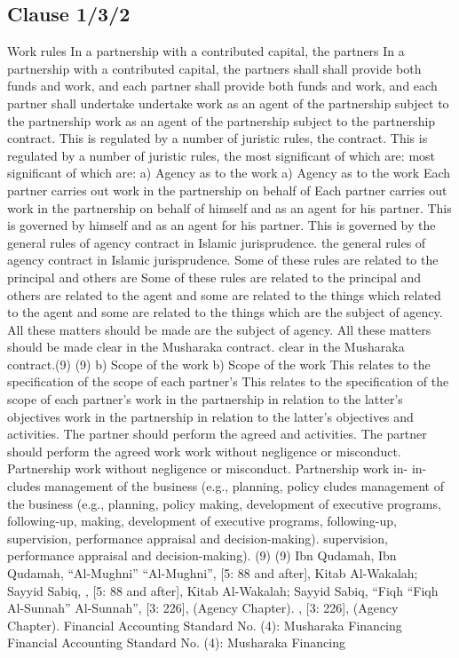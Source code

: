 \documentclass{article}%
\begin{document}
\subsection{Clause 1/3/2}%
\label{subsec:Clause1/3/2}%
Work rules   In a partnership with a contributed capital, the partners    In a partnership with a contributed capital, the partners shall  shall  provide both funds and work, and each partner shall  provide both funds and work, and each partner shall undertake  undertake  work as an agent of the partnership subject to the partnership  work as an agent of the partnership subject to the partnership  contract. This is regulated by a number of juristic rules, the  contract. This is regulated by a number of juristic rules, the  most significant of which are: most significant of which are: a) Agency as to the work  a) Agency as to the work   Each partner carries out work in the partnership on behalf of   Each partner carries out work in the partnership on behalf of  himself and as an agent for his partner. This is governed by  himself and as an agent for his partner. This is governed by  the general rules of agency contract in Islamic jurisprudence.  the general rules of agency contract in Islamic jurisprudence.  Some of these rules are related to the principal and others are  Some of these rules are related to the principal and others are  related to the agent and some are related to the things which  related to the agent and some are related to the things which  are the subject of agency. All these matters should be made  are the subject of agency. All these matters should be made  clear in the Musharaka contract. clear in the Musharaka contract.(9) (9) b) Scope of the work b) Scope of the work  This relates to the specification of the scope of each partner’s   This relates to the specification of the scope of each partner’s  work in the partnership in relation to the latter’s objectives  work in the partnership in relation to the latter’s objectives  and activities. The partner should perform the agreed  and activities. The partner should perform the agreed work  work  without negligence or misconduct. Partnership work  without negligence or misconduct. Partnership work in- in- cludes management of the business (e.g., planning, policy  cludes management of the business (e.g., planning, policy  making, development of executive programs, following-up,  making, development of executive programs, following-up,  supervision, performance appraisal and decision-making).  supervision, performance appraisal and decision-making).  (9) (9) Ibn Qudamah,   Ibn Qudamah, “Al-Mughni” “Al-Mughni”, [5: 88 and after], Kitab Al-Wakalah; Sayyid Sabiq,  , [5: 88 and after], Kitab Al-Wakalah; Sayyid Sabiq, “Fiqh  “Fiqh  Al-Sunnah” Al-Sunnah”, [3: 226], (Agency Chapter).  , [3: 226], (Agency Chapter).  Financial Accounting Standard No. (4): Musharaka Financing Financial Accounting Standard No. (4): Musharaka Financing
\end{document}
